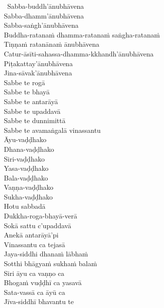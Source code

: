 \begin{pali-hang-together}
  \anglebracketleft\ \hspace{-0.5mm}Sabba-buddh'ānubhāvena \hspace{-0.5mm}\anglebracketright\ \\
  Sabba-dhamm'ānubhāvena\\
  Sabba-saṅgh'ānubhāvena\\
  Buddha-ratanaṁ dhamma-ratanaṁ saṅgha-ratanaṁ\\
  Tiṇṇaṁ ratanānaṁ ānubhāvena\\
  Catur-āsīti-sahassa-dhamma-kkhandh'ānubhāvena\\
  Piṭakattay'ānubhāvena\\
  Jina-sāvak'ānubhāvena\\
  Sabbe te rogā\\
  Sabbe te bhayā\\
  Sabbe te antarāyā\\
  Sabbe te upaddavā\\
  Sabbe te dunnimittā\\
  Sabbe te avamaṅgalā vinassantu\\
  Āyu-vaḍḍhako\\
  Dhana-vaḍḍhako\\
  Siri-vaḍḍhako\\
  Yasa-vaḍḍhako\\
  Bala-vaḍḍhako\\
  Vaṇṇa-vaḍḍhako\\
  Sukha-vaḍḍhako\\
  Hotu sabbadā\\
  \ifbfive\clearpage\fi
  Dukkha-roga-bhayā-verā\\
  Sokā sattu c'upaddavā\\
  Anekā antarāyā'pi\\
  Vinassantu ca tejasā\\
  Jaya-siddhi dhanaṁ lābhaṁ\\
  Sotthi bhāgyaṁ sukhaṁ balaṁ\\
  Siri āyu ca vaṇṇo ca\\
  Bhogaṁ vuḍḍhī ca yasavā\\
  Sata-vassā ca āyū ca\\
  Jīva-siddhī bhavantu te
\end{pali-hang-together}

